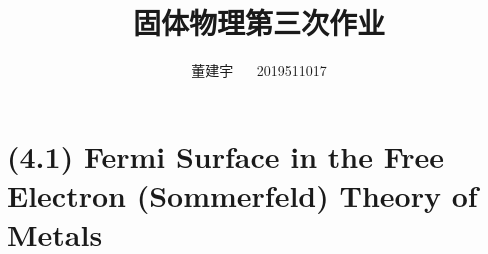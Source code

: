 \documentclass[reqno,a4paper,12pt]{amsart}
\title{固体物理第三次作业}
\author{董建宇 ~~ 2019511017}
\begin{document}
\maketitle
\titleformat{\section}[hang]{\small}{\thesection}{0.8em}{}{}
\titleformat{\subsection}[hang]{\small}{\thesubsection}{0.8em}{}{}

\section{\textbf{(4.1) Fermi Surface in the Free Electron (Sommerfeld) Theory of Metals}}
\end{document}

